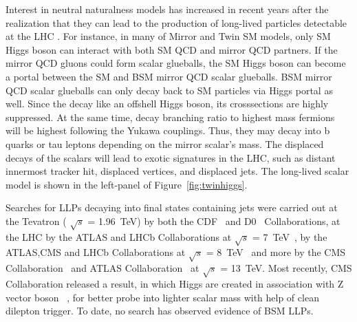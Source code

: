 Interest in neutral naturalness models has increased in recent years
after the realization that they can lead to the production of long-lived particles
detectable at the LHC \cite{Curtin:2015fna,Csaki:2015fba}.
For instance, in many of Mirror and Twin SM models, only SM Higgs boson can interact with both SM QCD and mirror QCD partners.
If the mirror QCD gluons could form scalar glueballs, the SM Higgs boson can become a portal between the SM and BSM mirror QCD scalar glueballs. 
BSM mirror QCD scalar glueballs can only decay back to SM particles via Higgs portal as well. 
Since the decay like an offshell Higgs boson, its crosssections are highly suppressed. 
At the same time, decay branching ratio to highest mass fermions will be highest following the Yukawa couplings.
Thus, they may decay into b quarks or tau leptons depending on the mirror scalar's mass.
The displaced decays of the scalars will lead to exotic signatures in the LHC, such as distant innermost tracker hit, displaced vertices, and displaced jets.
The long-lived scalar model is shown in the left-panel of Figure~\ref{fig:twinhiggs}.


Searches for LLPs decaying into final states containing jets were carried out
at the Tevatron ( $\sqrt{s}$ = 1.96~TeV) by both the CDF~\cite{Aaltonen:2011rja} and D0~\cite{Abazov:2009ik} Collaborations,
at the LHC by the ATLAS and LHCb Collaborations at $\sqrt{s}$ = 7~TeV~\cite{ATLAS:2012av,Aaij:2014nma},
by the ATLAS,CMS and LHCb Collaborations at $\sqrt{s}$ = 8~TeV~\cite{Aad:2015uaa,Aad:2015rba,PhysRevD.91.012007,Aad:2015asa,Aaij:2017mic,Aaij:2016xmb,Aaij:2015ica} and more by the
CMS Collaboration~\cite{Sirunyan:2017jdo,displacedvertices,displacedjets2016,delayedjets,emergingjets,CMS-PAS-EXO-19-021}
 and ATLAS Collaboration~\cite{Aaboud:2018iil,Aaboud:2018jbr,Aaboud:2018arf,Aaboud:2018aqj,Aaboud:2018kbe,Aaboud:2019trc,Aaboud:2019opc,Aad:2019kiz,Aad:2019pfm,Aad:2019tcc,Aad:2019xav,Aad:2019tua} at $\sqrt{s}$ = 13~TeV. 
Most recently, CMS Collaboration released a result, in which Higgs are created in association with Z vector boson ~\cite{ZHAN}, for better probe into lighter scalar mass with help of clean dilepton trigger.
To date, no search has observed evidence of BSM LLPs.

